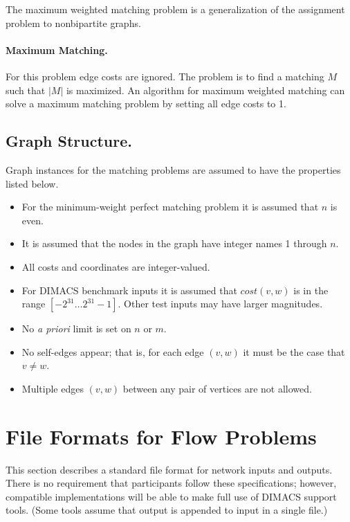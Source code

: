The maximum weighted matching problem is a generalization of the
assignment problem to nonbipartite graphs.

\paragraph{Maximum Matching.} 
For this problem edge costs are ignored.  The problem is to find a
matching $M$ such that $|M|$ is maximized.  An algorithm for maximum
weighted matching can solve a maximum matching problem by setting all
edge costs to 1.

\subsection{Graph Structure.} 
Graph instances for the matching problems are assumed to have the
properties listed below.

\begin{itemize}
\item For the minimum-weight perfect matching problem it is
assumed that $n$ is even.

\item It is assumed that the nodes in the graph have integer names 
1 through $n$.

\item All costs and coordinates are integer-valued.

\item For DIMACS benchmark inputs it is assumed that $cost(v,w)$ is
in the range $[-2^{31} \ldots 2^{31}-1]$.  Other test inputs may have
larger magnitudes.

\item No {\em a priori} limit is set on $n$ or $m$.  

\item No self-edges appear; that is, for each edge $(v,w)$ it must
be the case that $v \neq w$.  

\item Multiple edges $(v,w)$ between any pair of vertices are not
allowed. 

\end{itemize} 

\section{File Formats for Flow Problems} 

This section describes a standard file format for network inputs and outputs. 
There is no  requirement that participants follow these specifications;
however, compatible implementations will be able to make full use of 
DIMACS support tools.  (Some tools assume that output is appended
to input in a single file.) 

